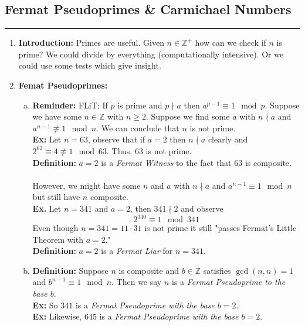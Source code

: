 \documentclass[class=article, crop=false]{standalone}
\def\integers{{\mathbb Z}}
\begin{document}
\subsection{Fermat Pseudoprimes \& Carmichael Numbers}
\rule{\textwidth}{1pt}
\begin{enumerate}[1.]
	\item \textbf{Introduction:}
	Primes are useful. Given $n\in\integers^+$ how can we check if $n$ is prime?
	We could divide by everything (computationally intensive).
	Or we could use some tests which give insight.
	
	\item \textbf{Femat Pseudoprimes:}
		\begin{enumerate}[(a)]
			\item \textbf{Reminder:}
				FLiT: If $p$ is prime and $p\nmid a$ then $a^{p-1}\equiv 1\mod p$.
				Suppose we have some $n\in\integers$ with $n\geq 2$. Suppose we find
				some $a$ with $n\nmid a$ and $a^{n-1}\not\equiv 1\mod n$. We can
				conclude that $n$ is not prime.\\
				\textbf{Ex:}
				Let $n=63$, observe that if $a=2$ then $n\nmid a$ clearly and
				$2^{62}\equiv 4\not\equiv 1\mod 63$. Thus, $63$ is not prime.\\
				\textbf{Definition:} $a=2$ is a \emph{Fermat Witness} to the fact that
				$63$ is composite.\\\\
				However, we might have some $n$ and $a$ with $n\nmid a$ and $a^{n-1}\equiv 1\mod n$
				but still have $n$ composite.\\
				\textbf{Ex.} Let $n=341$ and $a=2$, then $341\nmid 2$ and observe
				$$2^{340} \equiv 1\mod 341$$
				Even though $n=341=11\cdot 31$ is not prime it still "passes Fermat's
				Little Theorem with $a=2$."\\
				\textbf{Definition:} $a=2$ is a \emph{Fermat Liar} for $n=341$.

			\item \textbf{Definition:} 
				Suppose $n$ is composite and $b\in\integers$ satisfies
				$\gcd(n,n)=1$ and $b^{n-1}\equiv 1\mod n$. 
				Then we say $n$ is a \emph{Fermat Pseudoprime to the base $b$}.\\
				\textbf{Ex:} So $341$ is a \emph{Fermat Pseudoprime with the base $b=2$}.\\
				\textbf{Ex:} Likewise, $645$ is a \emph{Fermat Pseudoprime with the base $b=2$}.
		\end{enumerate}
	

\end{enumerate}
\end{document}
